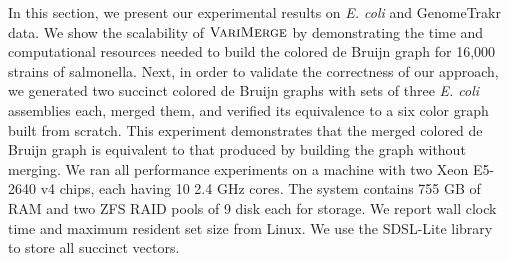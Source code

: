 In this section, we present our experimental results on {\em E. coli} and GenomeTrakr data. We show the scalability of $\mbox{\rm {\sc VariMerge}}$ by demonstrating the time and computational resources needed to build the colored de Bruijn graph for 16,000 strains of salmonella.  Next, in order to validate the correctness of our approach, we generated two succinct colored de Bruijn graphs with sets of three  \emph{E. coli} assemblies each, merged them, and verified its equivalence to a six color graph built from scratch.  This experiment demonstrates that the merged colored de Bruijn graph is equivalent to that produced by building the graph without merging.    We ran all performance experiments on a machine with two Xeon E5-2640 v4 chips, each having 10 2.4 GHz cores.  The system contains 755 GB of RAM and two ZFS RAID pools of 9 disk each for storage.  We report wall clock time and maximum resident set size from Linux.  We use the SDSL-Lite library~\cite{SDSL} to store all succinct vectors.

